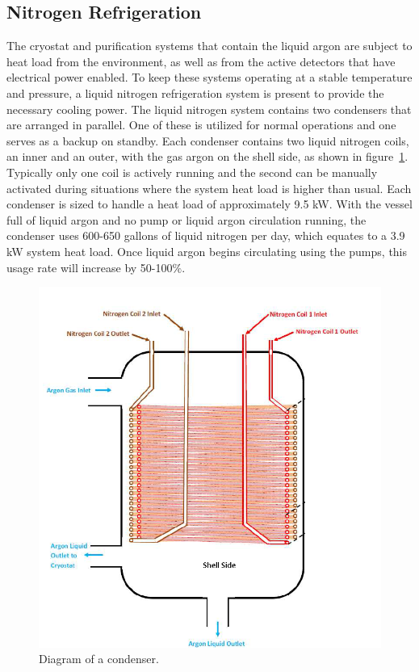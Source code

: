\subsection{Nitrogen Refrigeration}

The cryostat and purification systems that contain the liquid argon are subject to heat load from the environment, as well as from the active detectors that have electrical power enabled.  To keep these systems operating at a stable temperature and pressure, a liquid nitrogen refrigeration system is present to provide the necessary cooling power.  The liquid nitrogen system contains two condensers that are arranged in parallel.  One of these is utilized for normal operations and one serves as a backup on standby.  Each condenser contains two liquid nitrogen coils, an inner and an outer, with the gas argon on the shell side, as shown in figure~\ref{fig:condenser}.  Typically only one coil is actively running and the second can be manually activated during situations where the system heat load is higher than usual.  Each condenser is sized to handle a heat load of approximately 9.5 kW.  With the vessel full of liquid argon and no pump or liquid argon circulation running, the condenser uses 600-650 gallons of liquid nitrogen per day, which equates to a 3.9 kW system heat load.  Once liquid argon begins circulating using the pumps, this usage rate will increase by 50-100$\%$.

\begin{figure}[htb]
\centering	
\includegraphics[width=0.75\linewidth]{figures/condenser.png}
\caption{Diagram of a condenser.}
\label{fig:condenser}
\end{figure}




